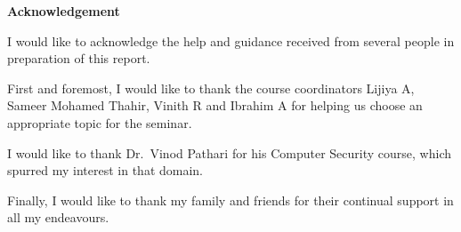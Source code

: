 {\centering \textbf{Acknowledgement}\\[0.25cm]}

I would like to acknowledge the help and guidance received from several people
in preparation of this report.

First and foremost, I would like to thank the course coordinators Lijiya A,
Sameer Mohamed Thahir, Vinith R and Ibrahim A for helping us choose an
appropriate topic for the seminar.

I would like to thank Dr.~Vinod Pathari for his Computer Security course, which
spurred my interest in that domain.

Finally, I would like to thank my family and friends for their continual
support in all my endeavours.
